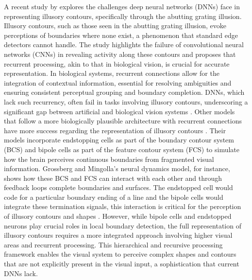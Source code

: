 \documentclass[12pt]{article}
\begin{document}
A recent study by \textcite{fanChallengingDeepLearning2023} explores the challenges deep neural networks (DNNs) face in representing illusory contours, specifically through the abutting grating illusion. Illusory contours, such as those seen in the abutting grating illusion, evoke perceptions of boundaries where none exist, a phenomenon that standard edge detectors cannot handle. The study highlights the failure of convolutional neural networks (CNNs) in revealing activity along these contours and proposes that recurrent processing, akin to that in biological vision, is crucial for accurate representation. In biological systems, recurrent connections allow for the integration of contextual information, essential for resolving ambiguities and ensuring consistent perceptual grouping and boundary completion. DNNs, which lack such recurrency, often fail in tasks involving illusory contours, underscoring a significant gap between artificial and biological vision systems \autocite{fanChallengingDeepLearning2023}. Other models that follow a more biologically plausible architecture with recurrent connections have more success regarding the representation of illusory contours \autocite{grossbergRoleIllusoryContours1987,vonderheydtMechanismsContourPerception1989}. Their models incorporate endstopping cells as part of the boundary contour system (BCS) and bipole cells as part of the feature contour system (FCS) to simulate how the brain perceives continuous boundaries from fragmented visual information. Grossberg and Mingolla's neural dynamics model, for instance, shows how these BCS and FCS can interact with each other and through feedback loops complete boundaries and surfaces. The endstopped cell would code for a particular boundary ending of a line and the bipole cells would integrate these termination signals, this interaction is critical for the perception of illusory contours and shapes \autocite{grossbergTextureSegregationSurface1998}. However, while bipole cells and endstopped neurons play crucial roles in local boundary detection, the full representation of illusory contours requires a more integrated approach involving higher visual areas and recurrent processing. This hierarchical and recursive processing framework enables the visual system to perceive complex shapes and contours that are not explicitly present in the visual input, a sophistication that current DNNs lack.
\end{document}
